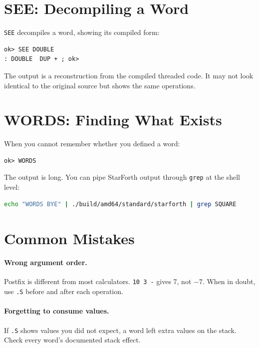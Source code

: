 \section{SEE: Decompiling a Word}
\label{sec:debug-see}

\texttt{SEE} decompiles a word, showing its compiled form:

\begin{lstlisting}[language=Forth]
ok> SEE DOUBLE
: DOUBLE  DUP + ; ok>
\end{lstlisting}

The output is a reconstruction from the compiled threaded code. It may not
look identical to the original source but shows the same operations.

\section{WORDS: Finding What Exists}
\label{sec:debug-words}

When you cannot remember whether you defined a word:

\begin{lstlisting}[language=Forth]
ok> WORDS
\end{lstlisting}

The output is long. You can pipe StarForth output through \texttt{grep} at
the shell level:

\begin{lstlisting}[language=bash]
echo "WORDS BYE" | ./build/amd64/standard/starforth | grep SQUARE
\end{lstlisting}

\section{Common Mistakes}
\label{sec:debug-mistakes}

\paragraph{Wrong argument order.}
Postfix is different from most calculators. \texttt{10 3 -} gives 7, not
\(-7\). When in doubt, use \texttt{.S} before and after each operation.

\paragraph{Forgetting to consume values.}
If \texttt{.S} shows values you did not expect, a word left extra values on
the stack. Check every word's documented stack effect.

